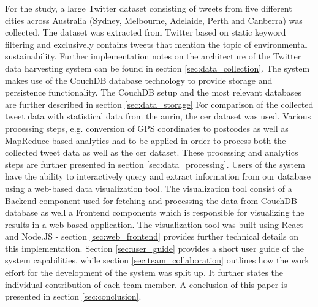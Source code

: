 \documentclass[11pt, oneside]{article}
\begin{document}
For the study, a large Twitter dataset consisting of tweets from five different cities across Australia (Sydney, Melbourne, Adelaide, Perth and Canberra) was collected. The dataset was extracted from Twitter based on static keyword filtering and exclusively contains tweets that mention the topic of environmental sustainability. Further implementation notes on the architecture of the Twitter data harvesting system can be found in section \ref{sec:data_collection}. 
\newline
\newline
The system makes use of the CouchDB database technology \citep{couchdb} to provide storage and persistence functionality. The CouchDB setup and the most relevant databases are further described in section \ref{sec:data_storage}
\newline
\newline
For comparison of the collected tweet data with statistical data from the \acrfull{aurin}, the \acrfull{cer} dataset was used. Various processing steps, e.g. conversion of GPS coordinates to postcodes as well as MapReduce-based analytics had to be applied in order to process both the collected tweet data as well as the \acrshort{cer} dataset. These processing and analytics steps are further presented in section \ref{sec:data_processing}.
\newline
\newline
Users of the system have the ability to interactively query and extract information from our database using a web-based data visualization tool. The visualization tool consist of a Backend component used for fetching and processing the data from CouchDB database as well a Frontend components which is responsible for visualizing the results in a web-based application. The visualization tool was built using React and Node.JS - section \ref{sec:web_frontend} provides further technical details on this implementation. 
\newline
\newline
Section \ref{sec:user_guide} provides a short user guide of the system capabilities, while section \ref{sec:team_collaboration} outlines how the work effort for the development of the system was split up. It further states the individual contribution of each team member. A conclusion of this paper is presented in section \ref{sec:conclusion}.
\end{document}

